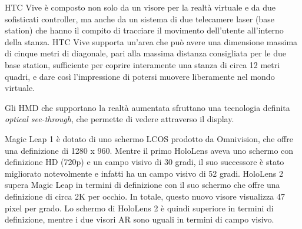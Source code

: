 HTC Vive è composto non solo da un visore per la realtà virtuale e da due sofisticati controller, ma anche da un sistema di due telecamere laser (base station) che hanno il compito di tracciare il movimento dell'utente all’interno della stanza. HTC Vive supporta un’area che può avere una dimensione massima di cinque metri di diagonale, pari alla massima distanza consigliata per le due base station, sufficiente per coprire interamente una stanza di circa 12 metri quadri, e dare così l’impressione di potersi muovere liberamente nel mondo virtuale.

Gli HMD che supportano la realtà aumentata sfruttano una tecnologia definita \textit{optical see-through}, che permette di vedere attraverso il display.

Magic Leap 1 è dotato di uno schermo LCOS prodotto da Omnivision, che offre una definizione di 1280 x 960. Mentre il primo HoloLens aveva uno schermo con definizione HD (720p) e un campo visivo di 30 gradi, il suo successore è stato migliorato notevolmente e infatti ha un campo visivo di 52 gradi. HoloLens 2 supera Magic Leap in termini di definizione con il suo schermo che offre una definizione di circa 2K per occhio. In totale, questo nuovo visore visualizza 47 pixel per grado. Lo schermo di HoloLens 2 è quindi superiore in termini di definizione, mentre i due visori AR sono uguali in termini di campo visivo.

